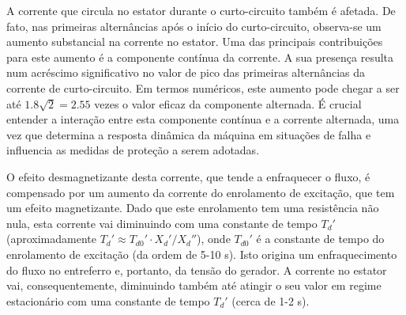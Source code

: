 \noindent A corrente que circula no estator durante o curto-circuito também é afetada. De fato, nas primeiras alternâncias após o início do curto-circuito, observa-se um aumento substancial na corrente no estator. Uma das principais contribuições para este aumento é a componente contínua da corrente. A sua presença resulta num acréscimo significativo no valor de pico das primeiras alternâncias da corrente de curto-circuito. Em termos numéricos, este aumento pode chegar a ser até $1.8\sqrt{2} = 2.55$ vezes o valor eficaz da componente alternada. É crucial entender a interação entre esta componente contínua e a corrente alternada, uma vez que determina a resposta dinâmica da máquina em situações de falha e influencia as medidas de proteção a serem adotadas. 

O efeito desmagnetizante desta corrente, que tende a enfraquecer o fluxo, é compensado por um aumento da corrente do enrolamento de excitação, que tem um efeito magnetizante. Dado que este enrolamento tem uma resistência não nula, esta corrente vai diminuindo com uma constante de tempo \(T_d'\) (aproximadamente \(T_d' \approx T_{d0}' \cdot X_d'/X_d''\)), onde \(T_{d0}'\) é a constante de tempo do enrolamento de excitação (da ordem de 5-10 s). Isto origina um enfraquecimento do fluxo no entreferro e, portanto, da tensão do gerador. A corrente no estator vai, consequentemente, diminuindo também até atingir o seu valor em regime estacionário com uma constante de tempo \(T_d'\) (cerca de 1-2 s).

